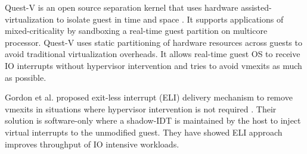 Quest-V is an open source separation kernel that uses hardware assisted-virtualization to isolate guest in time and space \cite{West:2016:VSK:2966277.2935748}.
It supports applications of mixed-criticality by sandboxing a real-time guest partition on multicore processor.
Quest-V uses static partitioning of hardware resources across guests to avoid traditional virtualization overheads.
It allows real-time guest OS to receive IO interrupts without hypervisor intervention and tries to avoid vmexits as much as possible.

Gordon et al. proposed exit-less interrupt (ELI) delivery mechanism to remove vmexits in situations where hypervisor intervention is not required \cite{Gordon:2012:EBP:2150976.2151020}.
Their solution is software-only where a shadow-IDT is maintained by the host to inject virtual interrupts to the unmodified guest.
They have showed ELI approach improves throughput of IO intensive workloads.





